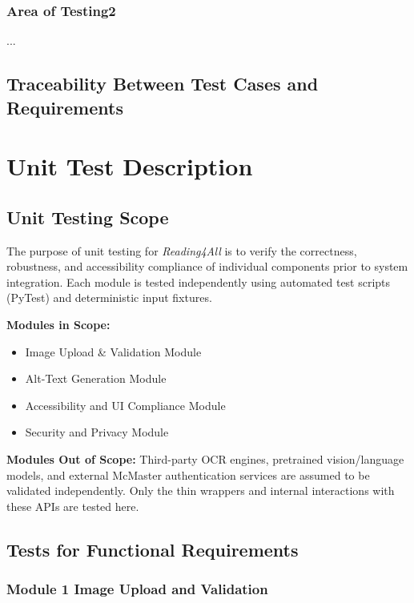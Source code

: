 \documentclass[12pt, titlepage]{article}
\begin{document}
\subsubsection{Area of Testing2}

...

\subsection{Traceability Between Test Cases and Requirements}


\section{Unit Test Description}
\subsection{Unit Testing Scope}

The purpose of unit testing for \textit{Reading4All} is to verify the correctness, robustness, and accessibility compliance of individual components prior to system integration. Each module is tested independently using automated test scripts (PyTest) and deterministic input fixtures.

\textbf{Modules in Scope:}
\begin{itemize}
  \item Image Upload \& Validation Module
  \item Alt-Text Generation Module
  \item Accessibility and UI Compliance Module
  \item Security and Privacy Module
\end{itemize}

\textbf{Modules Out of Scope:}
Third-party OCR engines, pretrained vision/language models, and external McMaster authentication services are assumed to be validated independently. Only the thin wrappers and internal interactions with these APIs are tested here.

\subsection{Tests for Functional Requirements}

\subsubsection{Module 1 \textemdash{} Image Upload and Validation}
\end{document}
